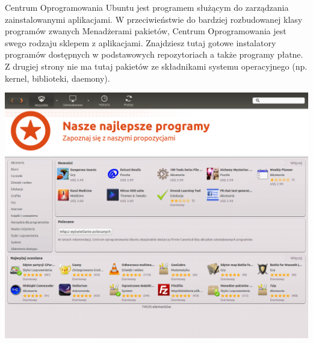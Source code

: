 \textcolor{ubuntu_orange}{Centrum Oprogramowania Ubuntu} jest programem służącym do zarządzania zainstalowanymi aplikacjami. W przeciwieństwie do bardziej rozbudowanej klasy programów zwanych Menadżerami pakietów, Centrum Oprogramowania jest swego rodzaju sklepem z aplikacjami. Znajdziesz tutaj gotowe instalatory programów dostępnych w podstawowych repozytoriach a także programy płatne. Z drugiej strony nie ma tutaj pakietów ze składnikami systemu operacyjnego (np. kernel, biblioteki, daemony).

\begin{center}
	\includegraphics[width=\linewidth]{images/programy_centrum.png}
\end{center} 

